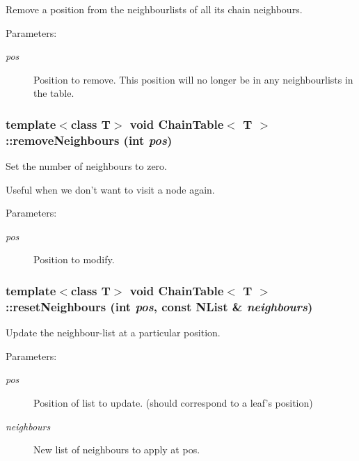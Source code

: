 Remove a position from the neighbourlists of all its chain neighbours. 

\begin{Desc}
\item[Parameters:]
\begin{description}
\item[{\em pos}]Position to remove. This position will no longer be in any neighbourlists in the table. \end{description}
\end{Desc}
\subsubsection{\setlength{\rightskip}{0pt plus 5cm}template$<$class T$>$ void {\bf Chain\-Table}$<$ T $>$::remove\-Neighbours (int {\em pos})\hspace{0.3cm}{\tt  [inline]}}\label{classChainTable_a7}


Set the number of neighbours to zero. 

Useful when we don't want to visit a node again. \begin{Desc}
\item[Parameters:]
\begin{description}
\item[{\em pos}]Position to modify. \end{description}
\end{Desc}
\subsubsection{\setlength{\rightskip}{0pt plus 5cm}template$<$class T$>$ void {\bf Chain\-Table}$<$ T $>$::reset\-Neighbours (int {\em pos}, const {\bf NList} \& {\em neighbours})\hspace{0.3cm}{\tt  [inline]}}\label{classChainTable_a6}


Update the neighbour-list at a particular position. 

\begin{Desc}
\item[Parameters:]
\begin{description}
\item[{\em pos}]Position of list to update. (should correspond to a leaf's position) \item[{\em neighbours}]New list of neighbours to apply at pos. \end{description}
\end{Desc}
